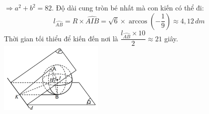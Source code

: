 \begin{ex}
{\begin{itemchoice}
{            $\Rightarrow a^2+b^2=82$.
            \itemch Độ dài cung tròn bé nhất mà con kiến có thể đi: $$l_{\wideparen{AB}}=R\times \widehat{AIB}=\sqrt{6}\times \arccos \left(-\dfrac{1}{9}\right)\approx 4{,}12\,dm$$
            Thời gian tối thiểu để kiến đến nơi là $\dfrac{l_{\wideparen{AB}}\times 10}{2}\approx 21$ giây.
            }
            {
                \includegraphics[width=5cm]{img/HXN-3-14-LG}
            }
        \end{itemchoice}
    }
\end{ex}
